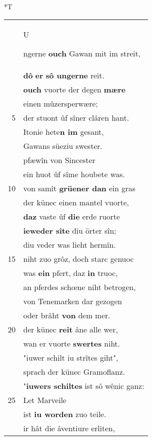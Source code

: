\documentclass[8pt,a4paper,notitlepage]{article}
\begin{document}
\begin{table}[ht]
\begin{minipage}[t]{0.5\linewidth}
\end{minipage}
\hspace{0.5cm}
\begin{minipage}[t]{0.5\linewidth}
\small
\begin{center}*T
\end{center}
\begin{tabular}{rl}
 & \begin{large}U\end{large}ngerne \textbf{ouch} Gawan mit im streit,\\ 
 & \textbf{dô} \textbf{er} \textbf{sô ungerne} reit.\\ 
 & \textbf{ouch} vuorte der degen \textbf{mære}\\ 
 & einen mûzersperwære;\\ 
5 & der stuont ûf sîner clâren hant.\\ 
 & Itonie hete\textbf{n im} gesant,\\ 
 & Gawans süeziu swester.\\ 
 & pfæwîn von Sincester\\ 
 & ein huot ûf sîme houbete was.\\ 
10 & von samît \textbf{grüener dan} ein gras\\ 
 & der künec einen mantel vuorte,\\ 
 & \textbf{daz} vaste ûf \textbf{die} erde ruorte\\ 
 & \textbf{ieweder sîte} diu örter sîn;\\ 
 & diu veder was lieht hermîn.\\ 
15 & niht zuo grôz, doch starc genuoc\\ 
 & was \textbf{ein} pfert, daz \textbf{in} truoc,\\ 
 & an pferdes schœne niht betrogen,\\ 
 & von Tenemarken dar gezogen\\ 
 & oder brâht \textbf{von} dem mer.\\ 
20 & der künec \textbf{reit} âne alle wer,\\ 
 & wan er vuorte \textbf{swertes} niht.\\ 
 & "iuwer schilt iu strîtes giht",\\ 
 & sprach der künec Gramoflanz.\\ 
 & "\textbf{iuwers schiltes} ist sô wênic ganz:\\ 
25 & Let Marveile\\ 
 & ist \textbf{iu worden} zuo teile.\\ 
 & ir hât die âventiure erliten,\\ 

\end{tabular}
\end{minipage}
\end{table}
\end{document}
